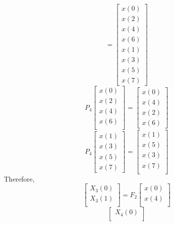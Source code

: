 \documentclass[journal,12pt,twocolumn]{IEEEtran}
\renewcommand\thesection{\arabic{section}}
\begin{document}
\begin{enumerate}[label=\arabic*.,ref=\thesection.\theenumi]
\begin{equation}
 = 
\begin{bmatrix}
x(0) \\ 
x(2) \\ 
x(4) \\ 
x(6) \\
x(1) \\ 
x(3) \\ 
x(5) \\
x(7)
\end{bmatrix}
\end{equation}
\begin{equation}
P_{4}
\begin{bmatrix}
x(0) \\ 
x(2) \\ 
x(4) \\ 
x(6) \\
\end{bmatrix}
 = 
\begin{bmatrix}
x(0) \\ 
x(4) \\ 
x(2) \\
x(6)
\end{bmatrix}
\end{equation}
\begin{equation}
P_{4}
\begin{bmatrix}
x(1) \\ 
x(3) \\ 
x(5) \\
x(7)
\end{bmatrix}
 = 
\begin{bmatrix}
x(1) \\ 
x(5) \\ 
x(3) \\ 
x(7) \\
\end{bmatrix}
\end{equation}
Therefore,
\begin{equation}
\begin{bmatrix}
X_{3}(0) \\ 
X_{3}(1)\\ 
\end{bmatrix}
= F_{2}
\begin{bmatrix}
x(0) \\ 
x(4) \\ 
\end{bmatrix}
\end{equation}
\begin{equation}
\begin{bmatrix}
X_{4}(0) \\ 

\end{bmatrix}
\end{equation}
\end{enumerate}
\end{document}
